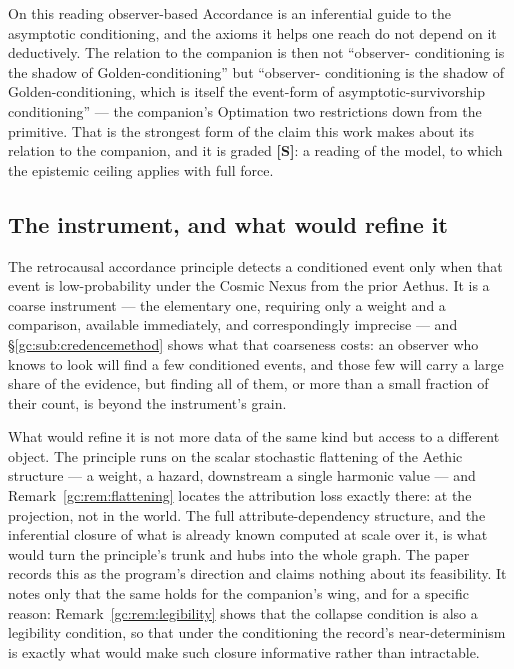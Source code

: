 \documentclass[11pt]{article}
\numberwithin{equation}{section}
\theoremstyle{plain}
\theoremstyle{definition}
\theoremstyle{remark}
\begin{document}
On this reading observer-based Accordance is an inferential guide to the
asymptotic conditioning, and the axioms it helps one reach do not depend
on it deductively. The relation to the companion is then not ``observer-
conditioning is the shadow of Golden-conditioning'' but ``observer-
conditioning is the shadow of Golden-conditioning, which is itself the
event-form of asymptotic-survivorship conditioning'' --- the companion's
Optimation two restrictions down from the primitive. That is the
strongest form of the claim this work makes about its relation to the
companion, and it is graded \textbf{[S]}: a reading of the model, to
which the epistemic ceiling applies with full force.

\subsection{The instrument, and what would refine it}\label{ra:sub:instrument}

The retrocausal accordance principle detects a conditioned event only
when that event is low-probability under the Cosmic Nexus from the prior
Aethus. It is a coarse instrument --- the elementary one, requiring only
a weight and a comparison, available immediately, and correspondingly
imprecise --- and \S\ref{gc:sub:credencemethod} shows what that
coarseness costs: an observer who knows to look will find a few
conditioned events, and those few will carry a large share of the
evidence, but finding all of them, or more than a small fraction of
their count, is beyond the instrument's grain.

What would refine it is not more data of the same kind but access to a
different object. The principle runs on the scalar stochastic flattening
of the Aethic structure --- a weight, a hazard, downstream a single
harmonic value --- and Remark~\ref{gc:rem:flattening} locates the
attribution loss exactly there: at the projection, not in the world. The
full attribute-dependency structure, and the inferential closure of what
is already known computed at scale over it, is what would turn the
principle's trunk and hubs into the whole graph. The paper records this
as the program's direction and claims nothing about its feasibility. It
notes only that the same holds for the companion's wing, and for a
specific reason: Remark~\ref{gc:rem:legibility} shows that the collapse
condition is also a legibility condition, so that under the conditioning
the record's near-determinism is exactly what would make such closure
informative rather than intractable.
\end{document}
